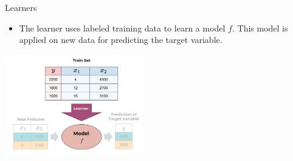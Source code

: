 \documentclass[11pt,compress,t,notes=noshow, xcolor=table]{beamer}
\begin{document}
\begin{vbframe}{Learners}
\newpage

\begin{itemize}
\item The learner uses labeled training data to learn a model $f$. This model is applied on new data for predicting the target variable.
\end{itemize}

 \begin{center}
    \includegraphics[width = 0.45\textwidth]{figure_man/the_inducer_web.png}
  \end{center}

\end{vbframe}
\end{document}
